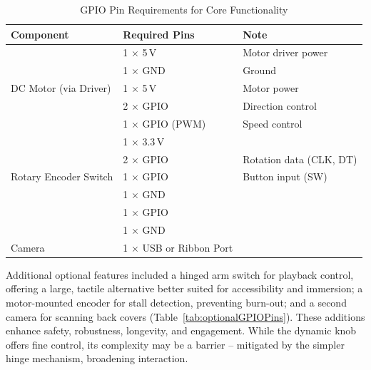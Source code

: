                 \begin{table}[htbp]
                    \centering
                    \caption{GPIO Pin Requirements for Core Functionality}
                    \label{tab:coreGPIOPins}
                    \begin{tabular}{|l|l|l|}
                        \hline
                        \textbf{Component} & \textbf{Required Pins} & \textbf{Note}\\ \hline
                        \multirow{5}{*}{DC Motor (via Driver)} & 1 × 5\,V & Motor driver power \\ \cline{2-3}
                                                               & 1 × GND & Ground \\ \cline{2-3}
                                                               & 1 × 5\,V & Motor power \\ \cline{2-3}
                                                               & 2 × GPIO & Direction control \\ \cline{2-3}
                                                               & 1 × GPIO (PWM) & Speed control \\ \hline
                        \multirow{5}{*}{Rotary Encoder Switch} & 1 × 3.3\,V & \\ \cline{2-3}
                                                               & 2 × GPIO& Rotation data (CLK, DT)\\ \cline{2-3}
                                                               & 1 × GPIO & Button input (SW)\\ \cline{2-3}
                                                               & 1 × GND & \\ \hline
                        \multirow{2}{*}{Button (Camera Trigger)} & 1 × GPIO & \\ \cline{2-3}
                                                                 & 1 × GND & \\ \hline
                        Camera & 1 × USB or Ribbon Port & \\ \hline
                    \end{tabular}
                \end{table}
    
                Additional optional features included a hinged arm switch for playback control, offering a large, tactile alternative better suited for accessibility and immersion; a motor-mounted encoder for stall detection, preventing burn-out; and a second camera for scanning back covers (Table~\ref{tab:optionalGPIOPins}). These additions enhance safety, robustness, longevity, and engagement. While the dynamic knob offers fine control, its complexity may be a barrier -- mitigated by the simpler hinge mechanism, broadening interaction.
    
